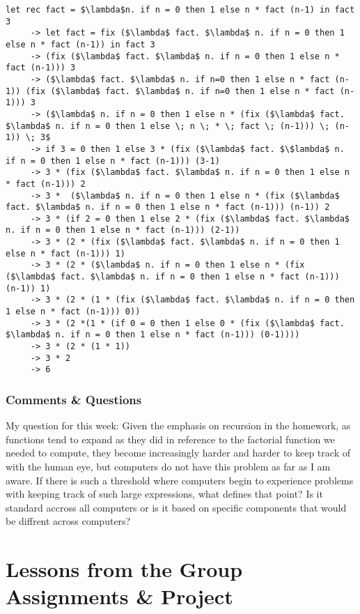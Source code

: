 \documentclass{article}
\theoremstyle{theorem}
\theoremstyle{definition}
\theoremstyle{remark}
\begin{document}
  \begin{lstlisting}[mathescape=true]
     let rec fact = $\lambda$n. if n = 0 then 1 else n * fact (n-1) in fact 3
     -> let fact = fix ($\lambda$ fact. $\lambda$ n. if n = 0 then 1 else n * fact (n-1)) in fact 3
     -> (fix ($\lambda$ fact. $\lambda$ n. if n = 0 then 1 else n * fact (n-1))) 3
     -> ($\lambda$ fact. $\lambda$ n. if n=0 then 1 else n * fact (n-1)) (fix ($\lambda$ fact. $\lambda$ n. if n=0 then 1 else n * fact (n-1))) 3
     -> ($\lambda$ n. if n = 0 then 1 else n * (fix ($\lambda$ fact. $\lambda$ n. if n = 0 then 1 else \; n \; * \; fact \; (n-1))) \; (n-1)) \; 3$
     -> if 3 = 0 then 1 else 3 * (fix ($\lambda$ fact. $\$lambda$ n. if n = 0 then 1 else n * fact (n-1))) (3-1)
     -> 3 * (fix ($\lambda$ fact. $\lambda$ n. if n = 0 then 1 else n * fact (n-1))) 2
     -> 3 *  ($\lambda$ n. if n = 0 then 1 else n * (fix ($\lambda$ fact. $\lambda$ n. if n = 0 then 1 else n * fact (n-1))) (n-1)) 2
     -> 3 * (if 2 = 0 then 1 else 2 * (fix ($\lambda$ fact. $\lambda$ n. if n = 0 then 1 else n * fact (n-1))) (2-1))
     -> 3 * (2 * (fix ($\lambda$ fact. $\lambda$ n. if n = 0 then 1 else n * fact (n-1))) 1)
     -> 3 * (2 * ($\lambda$ n. if n = 0 then 1 else n * (fix ($\lambda$ fact. $\lambda$ n. if n = 0 then 1 else n * fact (n-1))) (n-1)) 1)
     -> 3 * (2 * (1 * (fix ($\lambda$ fact. $\lambda$ n. if n = 0 then 1 else n * fact (n-1))) 0))
     -> 3 * (2 *(1 * (if 0 = 0 then 1 else 0 * (fix ($\lambda$ fact. $\lambda$ n. if n = 0 then 1 else n * fact (n-1))) (0-1))))
     -> 3 * (2 * (1 * 1))
     -> 3 * 2
     -> 6
  \end{lstlisting}
  

  \subsubsection{Comments \& Questions}

  My question for this week: Given the emphasis on recursion in the homework, as functions tend to expand as they did in reference to the factorial function we needed to compute, they become increasingly harder and harder to keep track of with the human eye, but computers do not have this problem as far as I am aware. If there is such a threshold where computers begin to experience problems with keeping track of such large expressions, what defines that point? Is it standard accross all computers or is it based on specific components that would be diffrent across computers?

  \section{Lessons from the Group Assignments \& Project}
\end{document}
